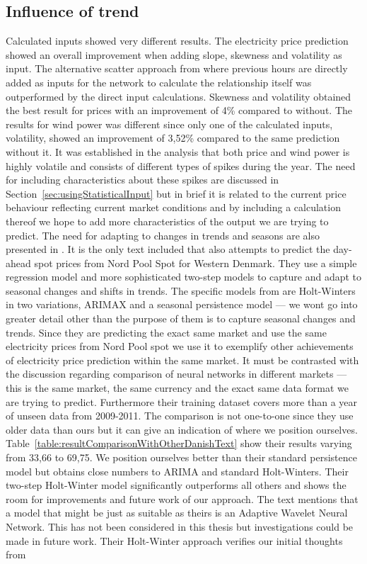 \subsection{Influence of trend}
\label{sec:influenceOfTrendInCalcInput}
Calculated inputs showed very different results. The electricity price prediction showed an overall improvement when adding slope, skewness and volatility as input. The alternative scatter approach from \cite{singhal2011electricity} where previous hours are directly added as inputs for the network to calculate the relationship itself was outperformed by the direct input calculations. Skewness and volatility obtained the best result for prices with an improvement of 4\% compared to without. The results for wind power was different since only one of the calculated inputs, volatility, showed an improvement of 3,52\% compared to the same prediction without it. It was established in the analysis that both price and wind power is highly volatile and consists of different types of spikes during the year. The need for including characteristics about these spikes are discussed in Section~\ref{sec:usingStatisticalInput} but in brief it is related to the current price behaviour reflecting current market conditions and by including a calculation thereof we hope to add more characteristics of the output we are trying to predict. The need for adapting to changes in trends and seasons are also presented in \cite{forecastingSpotPricesAccountingForWindPower}. It is the only text included that also attempts to predict the day-ahead spot prices from Nord Pool Spot for Western Denmark. They use a simple regression model and more sophisticated two-step models to capture and adapt to seasonal changes and shifts in trends. The specific models from \cite{forecastingSpotPricesAccountingForWindPower} are Holt-Winters in two variations, ARIMAX and a seasonal persistence model --- we wont go into greater detail other than the purpose of them is to capture seasonal changes and trends. Since they are predicting the exact same market and use the same electricity prices from Nord Pool spot we use it to exemplify other achievements of electricity price prediction within the same market. It must be contrasted with the discussion regarding comparison of neural networks in different markets --- this is the same market, the same currency and the exact same data format we are trying to predict. Furthermore their training dataset covers more than a year of unseen data from 2009-2011. The comparison is not one-to-one since they use older data than ours but it can give an indication of where we position ourselves. Table~\ref{table:resultComparisonWithOtherDanishText} show their results varying from 33,66 to 69,75. We position ourselves better than their standard persistence model but obtains close numbers to ARIMA and standard Holt-Winters. Their two-step Holt-Winter model significantly outperforms all others and shows the room for improvements and future work of our approach. The text mentions that a model that might be just as suitable as theirs is an Adaptive Wavelet Neural Network. This has not been considered in this thesis but investigations could be made in future work. Their Holt-Winter approach verifies our initial thoughts from 